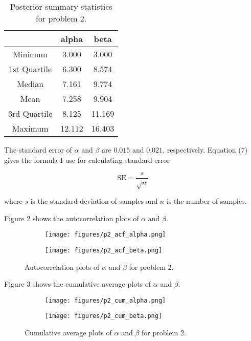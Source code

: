 \documentclass[12pt]{article}
\begin{document}
\begin{table}[H]
\centering
\caption{Posterior summary statistics for problem 2.}
\label{my-label}
\begin{tabular}{|c|c|c|}
\hline
             & alpha  & beta   \\ \hline
Minimum      & 3.000  & 3.000  \\ \hline
1st Quartile & 6.300  & 8.574  \\ \hline
Median       & 7.161  & 9.774  \\ \hline
Mean         & 7.258  & 9.904  \\ \hline
3rd Quartile & 8.125  & 11.169 \\ \hline
Maximum      & 12.112 & 16.403 \\ \hline
\end{tabular}
\end{table}

The standard error of $\alpha$ and $\beta$ are $0.015$ and $0.021$, respectively. Equation (7) gives the formula I use for calculating standard error

\begin{equation}
\text{SE} = \frac{s}{\sqrt{n}}
\end{equation}

where $s$ is the standard deviation of samples and $n$ is the number of samples.

Figure 2 shows the autocorrelation plots of $\alpha$ and $\beta$.

\begin{figure}[H]
\begin{subfigure}{.5\textwidth}
  \centering
  \texttt{[image: figures/p2\_acf\_alpha.png]}
\end{subfigure}
\begin{subfigure}{.5\textwidth}
  \centering
  \texttt{[image: figures/p2\_acf\_beta.png]}
\end{subfigure}
\caption{Autocorrelation plots of $\alpha$ and $\beta$ for problem 2.}
\end{figure}

Figure 3 shows the cumulative average plots of $\alpha$ and $\beta$.

\begin{figure}[H]
\begin{subfigure}{.5\textwidth}
  \centering
  \texttt{[image: figures/p2\_cum\_alpha.png]}
\end{subfigure}
\begin{subfigure}{.5\textwidth}
  \centering
  \texttt{[image: figures/p2\_cum\_beta.png]}
\end{subfigure}
\caption{Cumulative average plots of $\alpha$ and $\beta$ for problem 2.}
\end{figure}
\end{document}
